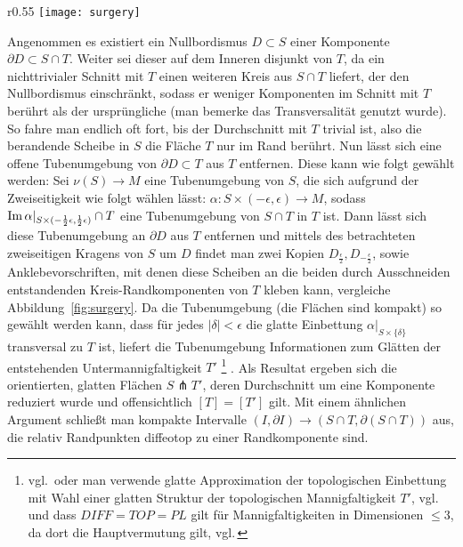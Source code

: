                         \begin{wrapfigure}{r}{0.55\textwidth}
                \centering
                \texttt{[image: surgery]}
                \caption{Ausschneiden einer Umgebung von $S\cap T$ und Ankleben zweier Scheiben, sodass die Homologieklasse erhalten bleibt}
                \label{fig:surgery}
            \end{wrapfigure} 
            Angenommen es existiert ein Nullbordismus $D\subset S$ einer Komponente $\partial D \subset S \cap T$. Weiter sei dieser auf dem Inneren disjunkt von $T$, da ein nichttrivialer Schnitt mit $T$ einen weiteren Kreis aus $S\cap T$ liefert, der den Nullbordismus einschränkt, sodass er weniger Komponenten im Schnitt mit $T$ berührt als der ursprüngliche (man bemerke das Transversalität genutzt wurde). So fahre man endlich oft fort, bis der Durchschnitt mit $T$ trivial ist, also die berandende Scheibe in $S$ die Fläche $T$ nur im Rand berührt.
            Nun lässt sich eine offene Tubenumgebung von $\partial D \subset T$ aus $T$ entfernen.
			Diese kann wie folgt gewählt werden: Sei $\nu(S) \to M$ eine Tubenumgebung von $S$, die sich aufgrund der Zweiseitigkeit wie folgt wählen lässt: $\alpha: S \times (-\epsilon,\epsilon) \to M$, sodass $\operatorname{Im}\alpha|_{S\times (-\frac 12\epsilon,\frac 12 \epsilon)} \cap T$ eine Tubenumgebung von $S\cap T $ in $ T$ ist. Dann lässt sich diese Tubenumgebung an $\partial D$ aus $T$ entfernen und mittels des betrachteten zweiseitigen Kragens von $S$ um $D$ findet man zwei Kopien $D_{\frac \epsilon 2}, D_{-\frac \epsilon 2}$, sowie Anklebevorschriften, mit denen diese Scheiben an die beiden durch Ausschneiden entstandenden Kreis-Randkomponenten von $T$ kleben kann, vergleiche Abbildung~\ref{fig:surgery}. Da die Tubenumgebung (die Flächen sind kompakt) so gewählt werden kann, dass für jedes $|\delta|<\epsilon$ die glatte Einbettung $\alpha|_{S \times \{\delta\}}$ transversal zu $T$ ist, liefert die Tubenumgebung Informationen zum Glätten der entstehenden Untermannigfaltigkeit $T'$ \footnote{vgl.\,\cite{WhiteheadJ.H.C..1961} oder man verwende glatte Approximation der topologischen Einbettung mit Wahl einer glatten Struktur der topologischen Mannigfaltigkeit $T'$, vgl.\,\cite[Chapter 5, Lemma 1.5]{Hirsch.1991} und dass $DIFF=TOP=PL$ gilt für Mannigfaltigkeiten in Dimensionen $\le 3$, da dort die Hauptvermutung gilt, vgl.\,\cite[Chapter 35,36]{Moise.1977}} . Als Resultat ergeben sich die orientierten, glatten Flächen $S \pitchfork T'$, deren Durchschnitt um eine Komponente reduziert wurde und offensichtlich $[T]=[T']$ gilt. Mit einem ähnlichen Argument schließt man kompakte Intervalle $(I,\partial I) \to (S\cap T, \partial(S\cap T))$ aus, die relativ Randpunkten diffeotop zu einer Randkomponente sind. 

